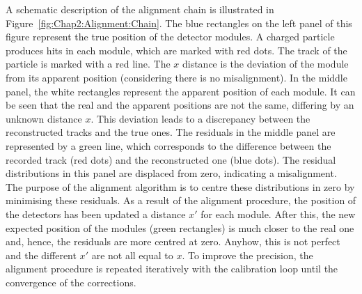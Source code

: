 A schematic description of the alignment chain is illustrated in Figure~\ref{fig:Chap2:Alignment:Chain}.
The blue rectangles on the left panel of this figure represent the true position of 
the detector modules. A charged particle produces hits in each module, 
which are marked with red dots. The track of the particle is marked with a red line. The $x$ distance
is the deviation of the module from its apparent position (considering there is no misalignment). In the middle panel, the white rectangles
represent the apparent position of each module. It can be seen that the real and the 
apparent positions are not the same, differing by an unknown distance $x$. This deviation leads to a discrepancy between 
the reconstructed tracks and the true ones. The residuals in the middle panel are represented by a green
line, which corresponds to the difference between the recorded track (red dots) and the reconstructed
one (blue dots). The residual distributions in this panel are displaced from zero, indicating a misalignment.
The purpose of the alignment algorithm is to centre these distributions in zero by minimising these residuals.
As a result of the alignment procedure, the position of the detectors has been updated a distance $x'$ 
for each module. After this, the new expected position of the modules (green rectangles) is much closer to 
the real one and, hence, the residuals are more centred at zero. Anyhow, this is not perfect and the different
$x'$  are not all equal to $x$. To improve the precision, the alignment procedure is repeated iteratively 
with the calibration loop until the convergence of the corrections.

